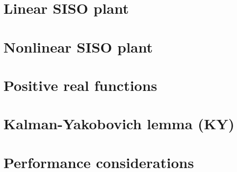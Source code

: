 \section{Linear SISO plant}


\section{Nonlinear SISO plant}


\section{Positive real functions}


\section{Kalman-Yakobovich lemma (KY)}


\section{Performance considerations}


